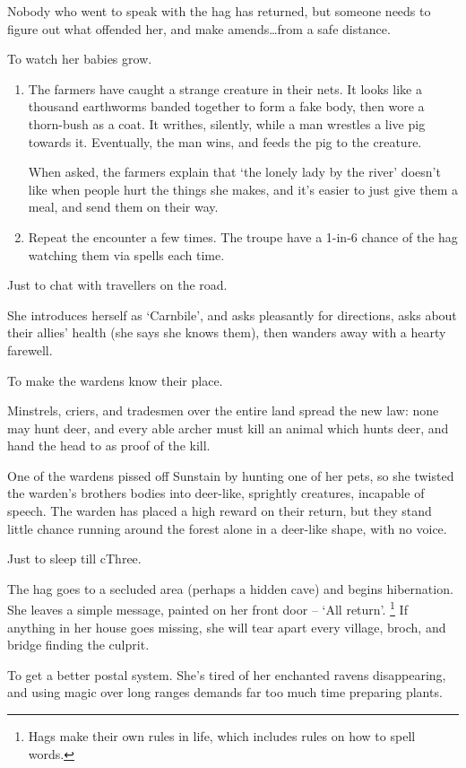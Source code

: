 \begin{multicols}{2}
\begin{dlist}
  Nobody who went to speak with the hag has returned, but someone needs to figure out what offended her, and make amends\ldots from a safe distance.
  \item
  To watch her babies grow.
  \begin{enumerate}
    \item
    The farmers have caught a strange creature in their nets.
    It looks like a thousand earthworms banded together to form a fake body, then wore a thorn-bush as a coat.
    It writhes, silently, while a man wrestles a live pig towards it.
    Eventually, the man wins, and feeds the pig to the creature.

    When asked, the farmers explain that `the lonely lady by the river' doesn't like when people hurt the things she makes, and it's easier to just give them a meal, and send them on their way.
    \item
    Repeat the encounter a few times.
    The troupe have a 1-in-6 chance of the hag watching them via spells each time.
  \end{enumerate}
  \item
  Just to chat with travellers on the road.

  She introduces herself as `Carnbile', and asks pleasantly for directions, asks about their allies' health (she says she knows them), then wanders away with a hearty farewell.
  \item
  To make the \glspl{warden} know their place.

  Minstrels, criers, and tradesmen over the entire land spread the new law: none may hunt deer, and every able archer must kill an animal which hunts deer, and hand the head to  as proof of the kill.

  One of the \glspl{warden} pissed off Sunstain by hunting one of her pets, so she twisted the \gls{warden}'s brothers bodies into deer-like, sprightly creatures, incapable of speech.
  The \gls{warden} has placed a high reward on their return, but they stand little chance running around the forest alone in a deer-like shape, with no voice.
  \item
  Just to sleep till \gls{cThree}.

  The hag goes to a secluded area (perhaps a hidden cave) and begins hibernation.
  She leaves a simple message, painted on her front door -- `{All return}'.%
  \footnote{Hags make their own rules in life, which includes rules on how to spell words.}
  If anything in her house goes missing, she will tear apart every \gls{village}, \gls{broch}, and bridge finding the culprit.
  \item
  To get a better postal system.
  She's tired of her enchanted ravens disappearing, and using magic over long ranges demands far too much time preparing plants.


\end{dlist}
\end{multicols}
